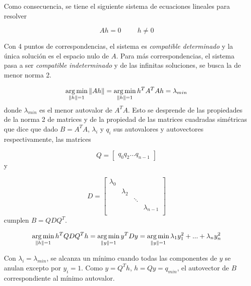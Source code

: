 Como consecuencia, se tiene el siguiente sistema de ecuaciones lineales para resolver

\begin{equation}
    Ah = 0 \hspace{1cm} h \neq 0
\end{equation}

Con 4 puntos de correspondencias, el sistema es \textit{compatible determinado} y la única solución es el espacio nulo de $A$. Para más correspondencias,
el sistema pasa a ser \textit{compatible indeterminado} y de las infinitas soluciones, se busca la de menor norma 2.

\begin{equation}
    \operatorname*{arg\,min}_{\left\lVert h\right\rVert=1} \left\lVert Ah\right\rVert = \operatorname*{arg\,min}_{\left\lVert h\right\rVert=1} h^{T}A^{T}Ah = \lambda_{min}
\end{equation}
donde $\lambda_{min}$ es el menor autovalor de $A^{T}A$. Esto se desprende de las propiedades de la norma 2 de matrices y de la propiedad de
las matrices cuadradas simétricas que dice que dado $B = A^{T}A$, $\lambda_{i}$ y $q_{i}$ sus autovalores y autovectores respectivamente, las matrices

\begin{equation}
    Q = \begin{bmatrix}
            q_{0} q_{2} \dots q_{n-1}
        \end{bmatrix}
\end{equation}
y

\begin{equation}
    D = \begin{bmatrix}
            \lambda_{0} & & & \\
                        & \lambda_{2} & & \\
                        & & \ddots & \\
                        & & & \lambda_{n-1}\\
        \end{bmatrix}
\end{equation}
cumplen $B = QDQ^{T}$.

\begin{equation}
    \operatorname*{arg\,min}_{\left\lVert h\right\rVert=1} h^{T}QDQ^{T}h = \operatorname*{arg\,min}_{\left\lVert y\right\rVert=1} y^{T}Dy = \operatorname*{arg\,min}_{\left\lVert y\right\rVert=1} \lambda_{1}y^{2}_{1} + ... + \lambda_{n}y^{2}_{n}
\end{equation}

Con $\lambda_{i} = \lambda_{min}$, se alcanza un mínimo cuando todas las componentes de $y$ se anulan excepto por $y_{i} = 1$. Como $y = Q^{T}h$,
$h=Qy = q_{min}$, el autovector de $B$ correspondiente al mínimo autovalor.


